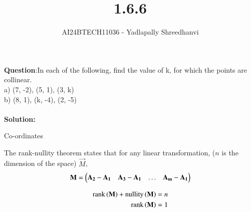 \documentclass[journal]{IEEEtran}
\begin{document}

\vspace{3cm}

\title{1.6.6}
\author{AI24BTECH11036 - Yadlapally Shreedhanvi}
{\let\newpage\relax\maketitle}

\renewcommand{\thefigure}{\theenumi}
\renewcommand{\thetable}{\theenumi}
\setlength{\intextsep}{10pt} %


\renewcommand{\thetable}{\theenumi}


\textbf{Question}:In each of the following, find the value of k, for which the points are collinear.\\
a) (7, -2), (5, 1), (3, k)\\
b) (8, 1), (k, -4), (2, -5)\\ \\

\textbf{Solution: }

\begin{table}[h!]    
  \centering
  
  \caption{Co-ordinates}
  \label{tab1.6.6.1}
\end{table}
The rank-nullity theorem states that for any linear transformation, ($n$ is the dimension of the space) $\vec{M}$, 
\begin{align}
	\mathbf{M}=\begin{pmatrix}\mathbf{A_{2}-A_{1}} & \mathbf{A_{3}-A_{1}} & \dots & \mathbf{A_{m}-A_{1}}\end{pmatrix} 
\end{align}

\begin{align}
\text{rank}\left(\mathbf{M}\right)+\text{nullity}\left(\mathbf{M}\right)=n
	\\
\text{rank}\left(\mathbf{M}\right)=1
\end{align}
\end{document}

